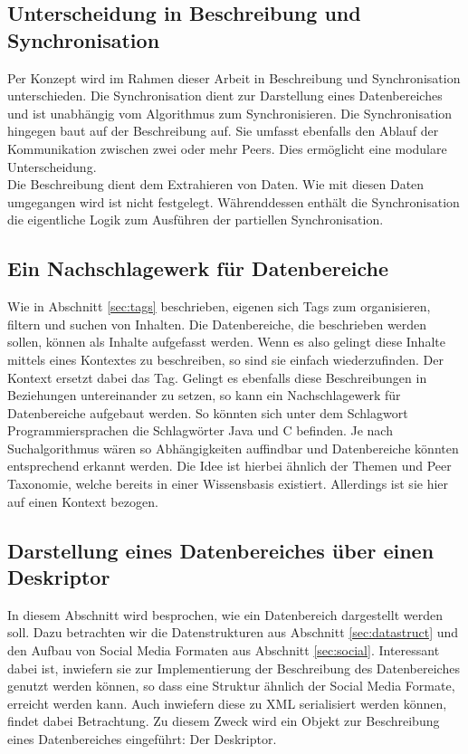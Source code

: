 \documentclass[a4paper]{article}
\begin{document}
	\subsection{Unterscheidung in Beschreibung und Synchronisation}
	
	Per Konzept wird im Rahmen dieser Arbeit in Beschreibung und Synchronisation
	unterschieden. Die Synchronisation dient zur Darstellung eines Datenbereiches
	und ist unabhängig vom Algorithmus zum Synchronisieren. Die Synchronisation
	hingegen baut auf der Beschreibung auf. Sie  umfasst ebenfalls den Ablauf
	der Kommunikation zwischen zwei oder mehr Peers. Dies ermöglicht eine modulare
	Unterscheidung. \\
	
	Die Beschreibung dient dem Extrahieren von Daten. Wie mit diesen
	Daten umgegangen wird ist nicht festgelegt. Währenddessen enthält die
	Synchronisation die eigentliche Logik zum Ausführen der partiellen
	Synchronisation. 	
	
	\subsection{Ein Nachschlagewerk für Datenbereiche}
	
	Wie in Abschnitt \ref{sec:tags} beschrieben, eigenen sich Tags zum organisieren,
	filtern und suchen von Inhalten. Die Datenbereiche, die beschrieben werden
	sollen, können als Inhalte aufgefasst werden. Wenn es also gelingt diese Inhalte
	mittels eines Kontextes zu beschreiben, so sind sie einfach wiederzufinden.
	Der Kontext ersetzt dabei das Tag. Gelingt es ebenfalls diese Beschreibungen in
	Beziehungen untereinander zu setzen, so kann ein Nachschlagewerk für
	Datenbereiche aufgebaut werden. So könnten sich unter dem Schlagwort
	Programmiersprachen die Schlagwörter Java und C befinden. 
	Je nach Suchalgorithmus wären so Abhängigkeiten auffindbar
	und Datenbereiche könnten entsprechend erkannt werden. Die Idee ist hierbei
	ähnlich der Themen und Peer Taxonomie, welche bereits in einer Wissensbasis
	existiert. Allerdings ist sie hier auf einen Kontext bezogen.
	
	\subsection{Darstellung eines Datenbereiches über einen Deskriptor}
	
	In diesem Abschnitt wird besprochen, wie ein Datenbereich dargestellt werden
	soll. Dazu betrachten wir die Datenstrukturen aus Abschnitt
	\ref{sec:datastruct} und den Aufbau von Social Media Formaten aus Abschnitt
	\ref{sec:social}. Interessant dabei ist, inwiefern sie zur Implementierung der
	Beschreibung des Datenbereiches genutzt werden können, so dass eine Struktur
	ähnlich der Social Media Formate, erreicht werden kann. Auch inwiefern
	diese zu XML serialisiert werden können, findet dabei Betrachtung. Zu diesem
	Zweck wird ein Objekt zur Beschreibung eines Datenbereiches eingeführt: Der
	Deskriptor. 
	
\end{document}
